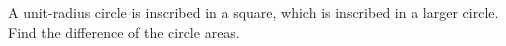 A unit-radius circle is inscribed in a square, which is inscribed in a larger circle. Find the difference of the circle areas.

